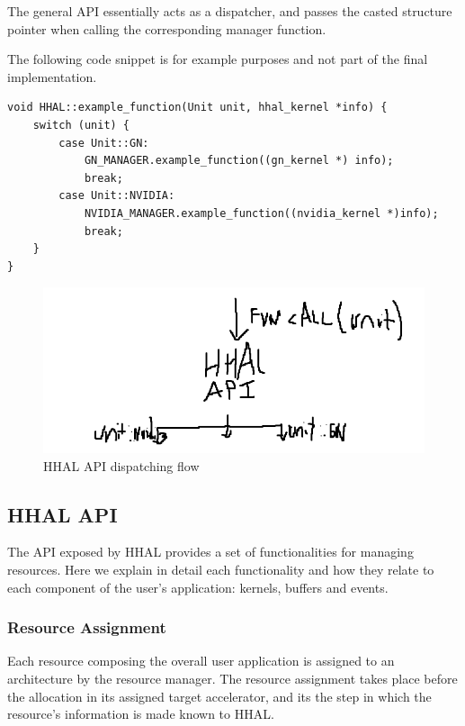 The general API essentially acts as a dispatcher, and passes the casted structure pointer when calling the corresponding manager function. 

The following code snippet is for example purposes and not part of the final implementation.

\begin{lstlisting}[style=CStyle, caption=HHAL API Example - Dispatching architecture-specific structures]
void HHAL::example_function(Unit unit, hhal_kernel *info) {
    switch (unit) {
        case Unit::GN:
            GN_MANAGER.example_function((gn_kernel *) info);
            break;
        case Unit::NVIDIA:
            NVIDIA_MANAGER.example_function((nvidia_kernel *)info);
            break;
    }
}
\end{lstlisting}

\begin{figure}[ht]
    \centering
    \includegraphics[width=\textwidth]{img/hhal_dispatcher.png}
    \captionsetup{justification=centering}
    \caption{HHAL API dispatching flow}
    \label{fig:hhal_dispatcher}
\end{figure}

\subsection{HHAL API}

The API exposed by HHAL provides a set of functionalities for managing resources. Here we explain in detail each functionality and how they relate to each component of the user's application: kernels, buffers and events.

\subsubsection{Resource Assignment}

Each resource composing the overall user application is assigned to an architecture by the resource manager. The resource assignment takes place before the allocation in its assigned target accelerator, and its the step in which the resource's information is made known to HHAL.

